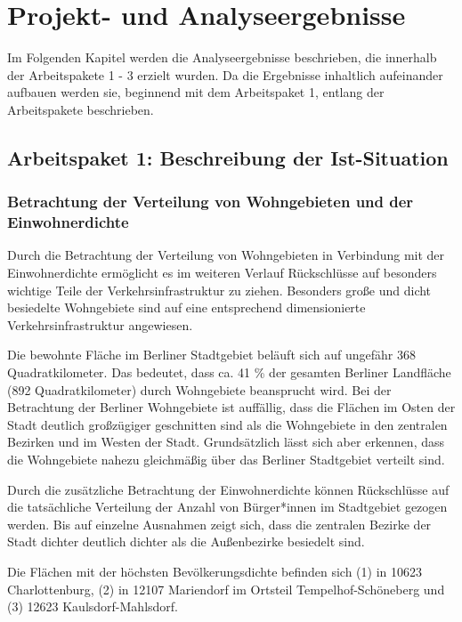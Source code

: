 \newpage
\section{Projekt-  und Analyseergebnisse}
\label{projekt_und_analyseergebnisse}

Im Folgenden Kapitel werden die Analyseergebnisse beschrieben, die innerhalb der Arbeitspakete 1 - 3 erzielt wurden. Da die Ergebnisse inhaltlich aufeinander aufbauen werden sie, beginnend mit dem Arbeitspaket 1, entlang der Arbeitspakete beschrieben.

\subsection{Arbeitspaket 1: Beschreibung der Ist-Situation}
\label{arbeitspaket_1_beschreibung_der_ist_situation}

\subsubsection{Betrachtung der Verteilung von Wohngebieten und der Einwohnerdichte}

Durch die Betrachtung der Verteilung von Wohngebieten in Verbindung mit der Einwohnerdichte ermöglicht es im weiteren Verlauf Rückschlüsse auf besonders wichtige Teile der Verkehrsinfrastruktur zu ziehen. Besonders große und dicht besiedelte Wohngebiete sind auf eine entsprechend dimensionierte Verkehrsinfrastruktur angewiesen.

Die bewohnte Fläche im Berliner Stadtgebiet beläuft sich auf ungefähr 368 Quadratkilometer. Das bedeutet, dass ca. 41 \% der gesamten Berliner Landfläche (892 Quadratkilometer) durch Wohngebiete beansprucht wird. Bei der Betrachtung der Berliner Wohngebiete ist auffällig, dass die Flächen im Osten der Stadt deutlich großzügiger geschnitten sind als die Wohngebiete in den zentralen Bezirken und im Westen der Stadt. Grundsätzlich lässt sich aber erkennen, dass die Wohngebiete nahezu gleichmäßig über das Berliner Stadtgebiet verteilt sind.

Durch die zusätzliche Betrachtung der Einwohnerdichte können Rückschlüsse auf die tatsächliche Verteilung der Anzahl von Bürger*innen im Stadtgebiet gezogen werden. Bis auf einzelne Ausnahmen zeigt sich, dass die zentralen Bezirke der Stadt dichter deutlich dichter als die Außenbezirke besiedelt sind.

Die Flächen mit der höchsten Bevölkerungsdichte befinden sich (1) in 10623 Charlottenburg, (2) in 12107 Mariendorf im Ortsteil Tempelhof-Schöneberg und (3) 12623 Kaulsdorf-Mahlsdorf.

